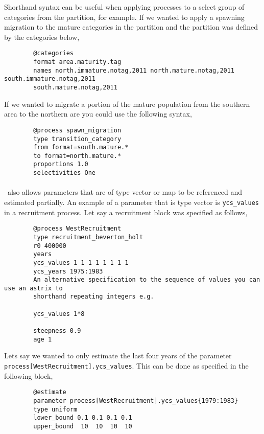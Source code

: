 Shorthand syntax can be useful when applying processes to a select group of categories from the partition, for example. If we wanted to apply a spawning migration to the mature categories in the partition and the partition was defined by the categories below,
{\small{\begin{verbatim}
		@categories 
		format area.maturity.tag
		names north.immature.notag,2011 north.mature.notag,2011 south.immature.notag,2011
		south.mature.notag,2011		
		\end{verbatim}}}	

If we wanted to migrate a portion of the mature population from the southern area to the northern are you could use the following syntax,

{\small{\begin{verbatim}
		@process spawn_migration
		type transition_category 		
		from format=south.mature.*	
		to format=north.mature.*
		proportions 1.0
		selectivities One
		\end{verbatim}}}


\paragraph*{\label{sec:params}}
\CNAME\ also allows parameters that are of type vector or map to be referenced and estimated partially. An example of a parameter that is type vector is \texttt{ycs\_values} in a recruitment process. Let say a recruitment block was specified as follows,
{\small{\begin{verbatim}
		@process WestRecruitment
		type recruitment_beverton_holt
		r0 400000
		years
		ycs_values 1 1 1 1 1 1 1 1 
		ycs_years 1975:1983
		An alternative specification to the sequence of values you can use an astrix to
		shorthand repeating integers e.g.
		
		ycs_values 1*8
		
		steepness 0.9
		age 1
		\end{verbatim}}}

Lets say we wanted to only estimate the last four years of the parameter \texttt{process[WestRecruitment].ycs\_values}. This can be done as specified in the following  block,

{\small{\begin{verbatim}
		@estimate
		parameter process[WestRecruitment].ycs_values{1979:1983}
		type uniform
		lower_bound 0.1 0.1 0.1 0.1
		upper_bound  10  10  10  10 
		\end{verbatim}}}

